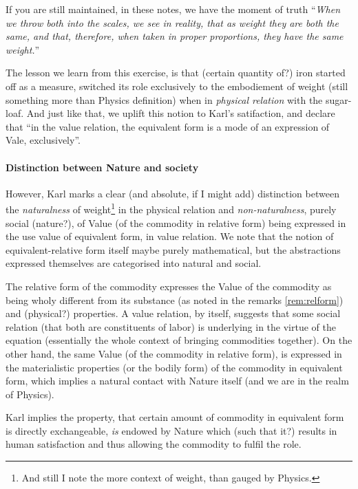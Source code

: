 \documentclass[12pt]{extarticle}
\theoremstyle{definition}
\begin{document}
If you are still maintained, in these notes, we have the moment of truth
``\emph{When we throw both into the scales, we see in reality, that as weight they are
  both the same, and that, therefore, when taken in proper proportions, they have the same weight.}''

The lesson we learn from this exercise, is that (certain quantity of?) iron started off as a measure, switched its role exclusively to the embodiement of weight (still something more than Physics definition) when in \emph{physical relation} with the sugar-loaf.  And just like that, we uplift this notion to Karl's satifaction, and declare that ``in the value relation, the equivalent form is a mode of an expression of Vale, exclusively''.


\paragraph{Distinction between Nature and society}
However, Karl marks a clear (and absolute, if I might add) distinction between the \emph{naturalness} of weight\footnote{And still I note the more context of weight, than gauged by Physics.} in the physical relation and \emph{non-naturalness}, purely social (nature?), of Value (of the commodity in relative form) being expressed in the use value of equivalent form, in value relation.  We note that the notion of equivalent-relative form itself maybe purely mathematical, but the abstractions expressed themselves are categorised into natural and social.

The relative form of the commodity expresses the Value of the commodity as being wholy different from its substance (as noted in the remarks \ref{rem:relform}) and (physical?) properties.  A value relation, by itself, suggests that some social relation (that both are constituents of labor) is underlying in the virtue of the equation (essentially the whole context of bringing commodities together).  On the other hand, the same Value (of the commodity in relative form), is expressed in the materialistic properties (or the bodily form) of the commodity in equivalent form, which implies a natural contact with Nature itself (and we are in the realm of Physics).

Karl implies the property, that certain amount of commodity in equivalent form is directly exchangeable, \emph{is} endowed by Nature which (such that it?) results in human satisfaction and thus allowing the commodity to fulfil the role.
\end{document}
